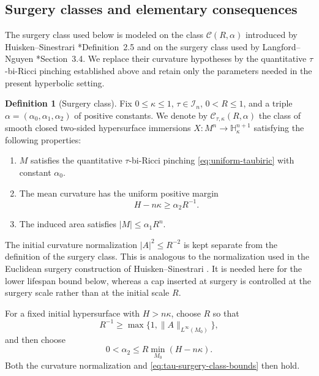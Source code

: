 \documentclass[11pt,reqno]{amsart}
\theoremstyle{definition}
\newtheorem{definition}[proposition]{Definition}
\theoremstyle{remark}
\numberwithin{equation}{section}
\newcommand{\Hh}{\mathbb H}
\newcommand{\CC}{\mathcal C}
\begin{document}
\subsection{Surgery classes and elementary consequences}
The surgery class used below is modeled on the class
$\mathcal C(R,\alpha)$ introduced by Huisken--Sinestrari
\cite{HS09}*{Definition~2.5} and on the surgery class used by
Langford--Nguyen \cite{LN21}*{Section~3.4}.  We replace their curvature
hypotheses by the quantitative $\tau$-bi-Ricci pinching established above
and retain only the parameters needed in the present hyperbolic setting.

\begin{definition}[Surgery class]
Fix $0\leq\kappa\leq1$, $\tau\in\mathcal I_n$, $0<R\leq1$, and a triple
$\alpha=(\alpha_0,\alpha_1,\alpha_2)$ of positive constants.  We denote by
$\CC_{\tau,\kappa}(R,\alpha)$ the class of smooth closed two-sided
hypersurface immersions $X:M^n\longrightarrow\Hh^{n+1}_{\kappa}$ satisfying the following properties:
\begin{enumerate}[label=\textup{(\roman*)},leftmargin=*]
\item $M$ satisfies the quantitative $\tau$-bi-Ricci pinching
\eqref{eq:uniform-taubiric} with constant $\alpha_0$.
\item The mean curvature has the uniform positive margin
\begin{equation}\label{eq:tau-surgery-class-bounds}
 H-n\kappa\geq\alpha_2R^{-1}.
\end{equation}
\item The induced area satisfies $ |M|\leq\alpha_1R^n$. 
\end{enumerate}
\end{definition}

The initial curvature normalization $|A|^2\leq R^{-2}$ is kept separate from the definition of the surgery class.  This is analogous to the normalization used in the Euclidean surgery construction of Huisken--Sinestrari \cite{HS09}. It is needed here for the lower lifespan bound below, whereas a cap inserted at surgery is controlled at the surgery scale rather than at the initial scale $R$.

For a fixed initial hypersurface with $H>n\kappa$, choose $R$ so that
\begin{equation*}
 R^{-1}\geq\max\{1,\|A\|_{L^\infty(M_0)}\},
\end{equation*}
and then choose
\begin{equation*}
 0<\alpha_2\leq R\min_{M_0}(H-n\kappa).
\end{equation*}
Both the curvature normalization and
\eqref{eq:tau-surgery-class-bounds} then hold.
\end{document}
